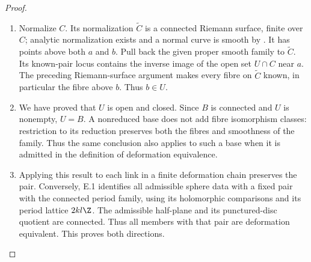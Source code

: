 \begin{proof}
\begin{enumerate}[label={$\langle1\rangle$\arabic*.},leftmargin=*]
\item Normalize $C$.  Its normalization
$\widetilde C$ is a connected Riemann
surface, finite over $C$; analytic
normalization exists and a normal
curve is smooth by
\cite[Chapter~II, Theorems~7.6 and~7.12]{Demailly2012E}.
It has points above both $a$ and $b$.
Pull back the given proper smooth
family to $\widetilde C$.  Its
known-pair locus contains the
inverse image of the open set
$U\cap C$ near $a$.  The preceding
Riemann-surface argument makes
every fibre on $\widetilde C$
known, in particular the fibre
above $b$.  Thus $b\in U$.

\item We have proved that $U$ is open
and closed.  Since $B$ is
connected and $U$ is nonempty,
$U=B$.  A nonreduced base
does not add fibre isomorphism
classes: restriction to its
reduction preserves both the
fibres and smoothness of the
family.  Thus the same conclusion
also applies to such a base
when it is admitted in the
definition of deformation
equivalence.

\item Applying this result to each
link in a finite deformation
chain preserves the pair.
Conversely, E.1 identifies
all admissible sphere data
with a fixed pair with the
connected period family,
using its holomorphic
comparisons and its period
lattice $2kl\Z$.
The admissible half-plane
and its punctured-disc
quotient are connected.
Thus all members with
that pair are deformation
equivalent.  This proves
both directions.

\end{enumerate}
\end{proof}

